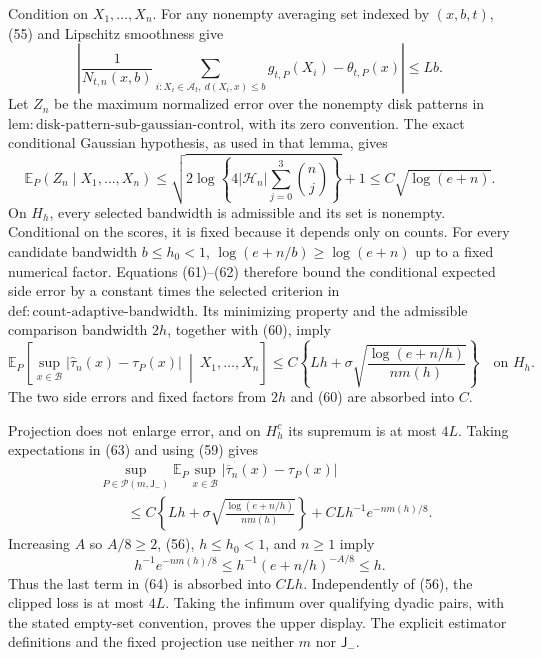 Condition on \(X_1,\ldots,X_n\). For any nonempty averaging set indexed by \((x,b,t)\), (55) and Lipschitz smoothness give
\[
 \left|
 \frac1{N_{t,n}(x,b)}
 \sum_{i:X_i\in\mathcal A_t,\ d(X_i,x)\le b}g_{t,P}(X_i)
 -\theta_{t,P}(x)
 \right|\le Lb. \tag{61}
\]
Let \(Z_n\) be the maximum normalized error over the nonempty disk patterns in \(\mathrm{lem:disk\text{-}pattern\text{-}sub\text{-}gaussian\text{-}control}\), with its zero convention. The exact conditional Gaussian hypothesis, as used in that lemma, gives
\[
 \mathbb E_P(Z_n\mid X_1,\ldots,X_n)
 \le\sqrt{2\log\left\{4|\mathcal H_n|\sum_{j=0}^{3}\binom nj\right\}}+1
 \le C\sqrt{\log(e+n)}. \tag{62}
\]
On \(H_h\), every selected bandwidth is admissible and its set is nonempty. Conditional on the scores, it is fixed because it depends only on counts. For every candidate bandwidth \(b\le h_0<1\), \(\log(e+n/b)\ge\log(e+n)\) up to a fixed numerical factor. Equations (61)--(62) therefore bound the conditional expected side error by a constant times the selected criterion in \(\mathrm{def:count\text{-}adaptive\text{-}bandwidth}\). Its minimizing property and the admissible comparison bandwidth \(2h\), together with (60), imply
\[
 \mathbb E_P\left[
 \sup_{x\in\mathcal B}|\widehat\tau_n(x)-\tau_P(x)|
 \ \middle|\ X_1,\ldots,X_n
 \right]
 \le C\left\{Lh+\sigma\sqrt{\frac{\log(e+n/h)}{nm(h)}}\right\}
 \quad\text{on }H_h. \tag{63}
\]
The two side errors and fixed factors from \(2h\) and (60) are absorbed into \(C\).

Projection does not enlarge error, and on \(H_h^c\) its supremum is at most \(4L\). Taking expectations in (63) and using (59) gives
\[
 \begin{aligned}
 &\sup_{P\in\mathcal P(m,\mathsf J_{-})}
 \mathbb E_P\sup_{x\in\mathcal B}|\overline\tau_n(x)-\tau_P(x)|\\
 &\qquad\le C\left\{Lh+\sigma\sqrt{\frac{\log(e+n/h)}{nm(h)}}\right\}
 +CLh^{-1}e^{-nm(h)/8}. 
 \end{aligned} \tag{64}
\]
Increasing \(A\) so \(A/8\ge2\), (56), \(h\le h_0<1\), and \(n\ge1\) imply
\[
 h^{-1}e^{-nm(h)/8}
 \le h^{-1}(e+n/h)^{-A/8}
 \le h.
\]
Thus the last term in (64) is absorbed into \(CLh\). Independently of (56), the clipped loss is at most \(4L\). Taking the infimum over qualifying dyadic pairs, with the stated empty-set convention, proves the upper display. The explicit estimator definitions and the fixed projection use neither \(m\) nor \(\mathsf J_{-}\).

